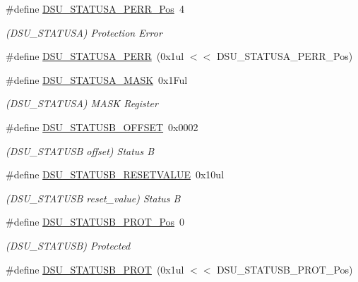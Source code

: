 \begin{DoxyCompactItemize}
\item 
\#define \mbox{\hyperlink{group___s_a_m_d21___d_s_u_ga2d5f7f64db290d822709d358b9d8baf6}{D\+S\+U\+\_\+\+S\+T\+A\+T\+U\+S\+A\+\_\+\+P\+E\+R\+R\+\_\+\+Pos}}~4
\begin{DoxyCompactList}\small\item\em (D\+S\+U\+\_\+\+S\+T\+A\+T\+U\+SA) Protection Error \end{DoxyCompactList}\item 
\#define \mbox{\hyperlink{group___s_a_m_d21___d_s_u_ga0d09a64d9359e44b57ebd1734163e059}{D\+S\+U\+\_\+\+S\+T\+A\+T\+U\+S\+A\+\_\+\+P\+E\+RR}}~(0x1ul $<$$<$ D\+S\+U\+\_\+\+S\+T\+A\+T\+U\+S\+A\+\_\+\+P\+E\+R\+R\+\_\+\+Pos)
\item 
\#define \mbox{\hyperlink{group___s_a_m_d21___d_s_u_ga054a84324fddaaecb1b58f35c2314bc7}{D\+S\+U\+\_\+\+S\+T\+A\+T\+U\+S\+A\+\_\+\+M\+A\+SK}}~0x1\+Ful
\begin{DoxyCompactList}\small\item\em (D\+S\+U\+\_\+\+S\+T\+A\+T\+U\+SA) M\+A\+SK Register \end{DoxyCompactList}\item 
\#define \mbox{\hyperlink{group___s_a_m_d21___d_s_u_ga6633a1098b38470e1cefd46795f0cf93}{D\+S\+U\+\_\+\+S\+T\+A\+T\+U\+S\+B\+\_\+\+O\+F\+F\+S\+ET}}~0x0002
\begin{DoxyCompactList}\small\item\em (D\+S\+U\+\_\+\+S\+T\+A\+T\+U\+SB offset) Status B \end{DoxyCompactList}\item 
\#define \mbox{\hyperlink{group___s_a_m_d21___d_s_u_gaef2faaac59541260b63b58569da04dee}{D\+S\+U\+\_\+\+S\+T\+A\+T\+U\+S\+B\+\_\+\+R\+E\+S\+E\+T\+V\+A\+L\+UE}}~0x10ul
\begin{DoxyCompactList}\small\item\em (D\+S\+U\+\_\+\+S\+T\+A\+T\+U\+SB reset\+\_\+value) Status B \end{DoxyCompactList}\item 
\#define \mbox{\hyperlink{group___s_a_m_d21___d_s_u_gacd0a6b404b8ba52afe784b653e1b4ee7}{D\+S\+U\+\_\+\+S\+T\+A\+T\+U\+S\+B\+\_\+\+P\+R\+O\+T\+\_\+\+Pos}}~0
\begin{DoxyCompactList}\small\item\em (D\+S\+U\+\_\+\+S\+T\+A\+T\+U\+SB) Protected \end{DoxyCompactList}\item 
\#define \mbox{\hyperlink{group___s_a_m_d21___d_s_u_ga0ba62e190f2b944deffdbfc40a7ce33a}{D\+S\+U\+\_\+\+S\+T\+A\+T\+U\+S\+B\+\_\+\+P\+R\+OT}}~(0x1ul $<$$<$ D\+S\+U\+\_\+\+S\+T\+A\+T\+U\+S\+B\+\_\+\+P\+R\+O\+T\+\_\+\+Pos)

\end{DoxyCompactItemize}

